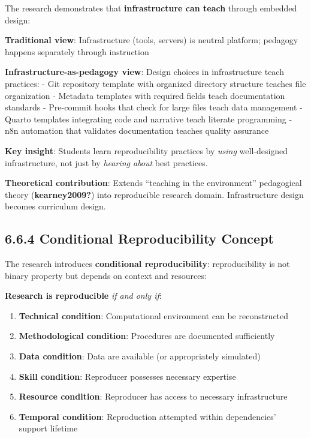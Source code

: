 \documentclass[
  oneside,
  open=any]{scrbook}
\providecommand{\tightlist}{%
  \setlength{\itemsep}{0pt}\setlength{\parskip}{0pt}}\usepackage{longtable,booktabs,array}
\begin{document}
The research demonstrates that \textbf{infrastructure can teach} through
embedded design:

\textbf{Traditional view}: Infrastructure (tools, servers) is neutral
platform; pedagogy happens separately through instruction

\textbf{Infrastructure-as-pedagogy view}: Design choices in
infrastructure teach practices: - Git repository template with organized
directory structure teaches file organization - Metadata templates with
required fields teach documentation standards - Pre-commit hooks that
check for large files teach data management - Quarto templates
integrating code and narrative teach literate programming - n8n
automation that validates documentation teaches quality assurance

\textbf{Key insight}: Students learn reproducibility practices by
\emph{using} well-designed infrastructure, not just by \emph{hearing
about} best practices.

\textbf{Theoretical contribution}: Extends ``teaching in the
environment'' pedagogical theory (\textbf{kearney2009?}) into
reproducible research domain. Infrastructure design becomes curriculum
design.

\subsection{6.6.4 Conditional Reproducibility
Concept}\label{conditional-reproducibility-concept}

The research introduces \textbf{conditional reproducibility}:
reproducibility is not binary property but depends on context and
resources:

\textbf{Research is reproducible} \emph{if and only if}:

\begin{enumerate}
\def\labelenumi{\arabic{enumi}.}
\tightlist
\item
  \textbf{Technical condition}: Computational environment can be
  reconstructed
\item
  \textbf{Methodological condition}: Procedures are documented
  sufficiently
\item
  \textbf{Data condition}: Data are available (or appropriately
  simulated)
\item
  \textbf{Skill condition}: Reproducer possesses necessary expertise
\item
  \textbf{Resource condition}: Reproducer has access to necessary
  infrastructure
\item
  \textbf{Temporal condition}: Reproduction attempted within
  dependencies' support lifetime
\end{enumerate}
\end{document}

